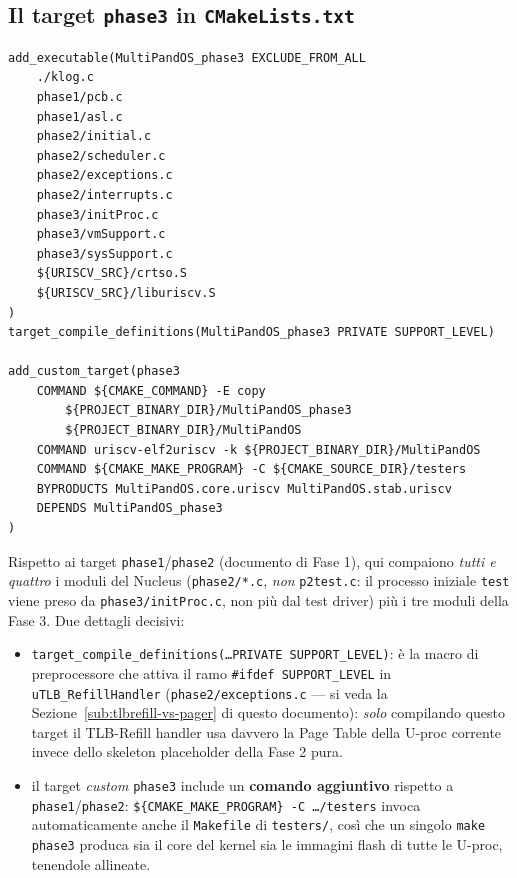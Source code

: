 \documentclass[11pt,a4paper]{article}
\newcommand{\code}[1]{\texttt{#1}}
\begin{document}
\subsection{Il target \code{phase3} in \code{CMakeLists.txt}}
\begin{lstlisting}
add_executable(MultiPandOS_phase3 EXCLUDE_FROM_ALL
    ./klog.c
    phase1/pcb.c
    phase1/asl.c
    phase2/initial.c
    phase2/scheduler.c
    phase2/exceptions.c
    phase2/interrupts.c
    phase3/initProc.c
    phase3/vmSupport.c
    phase3/sysSupport.c
    ${URISCV_SRC}/crtso.S
    ${URISCV_SRC}/liburiscv.S
)
target_compile_definitions(MultiPandOS_phase3 PRIVATE SUPPORT_LEVEL)

add_custom_target(phase3
    COMMAND ${CMAKE_COMMAND} -E copy
        ${PROJECT_BINARY_DIR}/MultiPandOS_phase3
        ${PROJECT_BINARY_DIR}/MultiPandOS
    COMMAND uriscv-elf2uriscv -k ${PROJECT_BINARY_DIR}/MultiPandOS
    COMMAND ${CMAKE_MAKE_PROGRAM} -C ${CMAKE_SOURCE_DIR}/testers
    BYPRODUCTS MultiPandOS.core.uriscv MultiPandOS.stab.uriscv
    DEPENDS MultiPandOS_phase3
)
\end{lstlisting}
Rispetto ai target \code{phase1}/\code{phase2} (documento di Fase 1), qui
compaiono \emph{tutti e quattro} i moduli del Nucleus (\code{phase2/*.c},
\emph{non} \code{p2test.c}: il processo iniziale \code{test} viene preso da
\code{phase3/initProc.c}, non più dal test driver) più i tre moduli della
Fase 3. Due dettagli decisivi:
\begin{itemize}
\item \code{target\_compile\_definitions(\ldots PRIVATE SUPPORT\_LEVEL)}:
  è la macro di preprocessore che attiva il ramo \code{\#ifdef
  SUPPORT\_LEVEL} in \code{uTLB\_RefillHandler} (\code{phase2/exceptions.c}
  --- si veda la Sezione~\ref{sub:tlbrefill-vs-pager} di questo documento):
  \emph{solo} compilando
  questo target il TLB-Refill handler usa davvero la Page Table della
  U-proc corrente invece dello skeleton placeholder della Fase 2 pura.
\item il target \emph{custom} \code{phase3} include un
  \textbf{comando aggiuntivo} rispetto a \code{phase1}/\code{phase2}:
  \code{\$\{CMAKE\_MAKE\_PROGRAM\} -C \ldots/testers} invoca automaticamente
  anche il \code{Makefile} di \code{testers/}, così che un singolo
  \code{make phase3} produca sia il core del kernel sia le immagini flash
  di tutte le U-proc, tenendole allineate.
\end{itemize}
\end{document}
